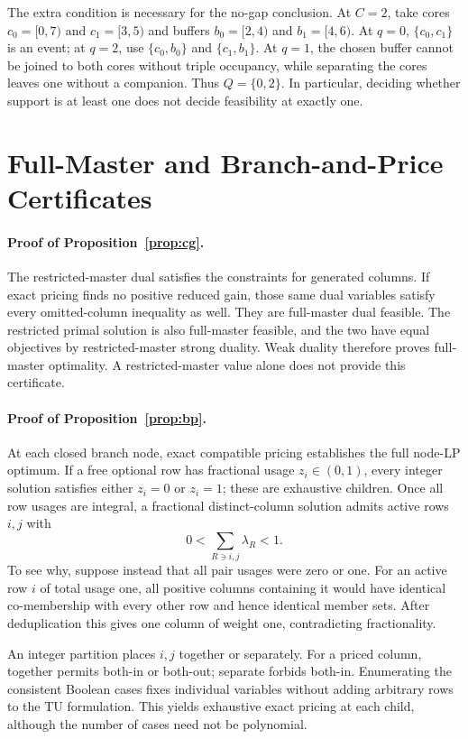 The extra condition is necessary for the no-gap conclusion. At $C=2$, take
cores $c_0=[0,7)$ and $c_1=[3,5)$ and buffers $b_0=[2,4)$ and
$b_1=[4,6)$. At $q=0$, $\{c_0,c_1\}$ is an event; at $q=2$, use
$\{c_0,b_0\}$ and $\{c_1,b_1\}$. At $q=1$, the chosen buffer cannot be
joined to both cores without triple occupancy, while separating the cores
leaves one without a companion. Thus $Q=\{0,2\}$. In particular, deciding
whether support is at least one does not decide feasibility at exactly one.

\section{Full-Master and Branch-and-Price Certificates}

\paragraph{Proof of Proposition~\ref{prop:cg}.}
The restricted-master dual satisfies the constraints for generated columns.
If exact pricing finds no positive reduced gain, those same dual variables
satisfy every omitted-column inequality as well. They are full-master dual
feasible. The restricted primal solution is also full-master feasible, and
the two have equal objectives by restricted-master strong duality. Weak
duality therefore proves full-master optimality. A restricted-master value
alone does not provide this certificate.

\paragraph{Proof of Proposition~\ref{prop:bp}.}
At each closed branch node, exact compatible pricing establishes the full
node-LP optimum. If a free optional row has fractional usage $z_i\in(0,1)$,
every integer solution satisfies either $z_i=0$ or $z_i=1$; these are
exhaustive children. Once all row usages are integral, a fractional
distinct-column solution admits active rows $i,j$ with
\[
 0<\sum_{R\ni i,j}\lambda_R<1.
\]
To see why, suppose instead that all pair usages were zero or one. For an
active row $i$ of total usage one, all positive columns containing it would
have identical co-membership with every other row and hence identical member
sets. After deduplication this gives one column of weight one, contradicting
fractionality.

An integer partition places $i,j$ together or separately. For a priced column,
together permits both-in or both-out; separate forbids both-in.
Enumerating the consistent Boolean cases fixes individual variables without
adding arbitrary rows to the TU formulation. This yields exhaustive exact
pricing at each child, although the number of cases need not be polynomial.

